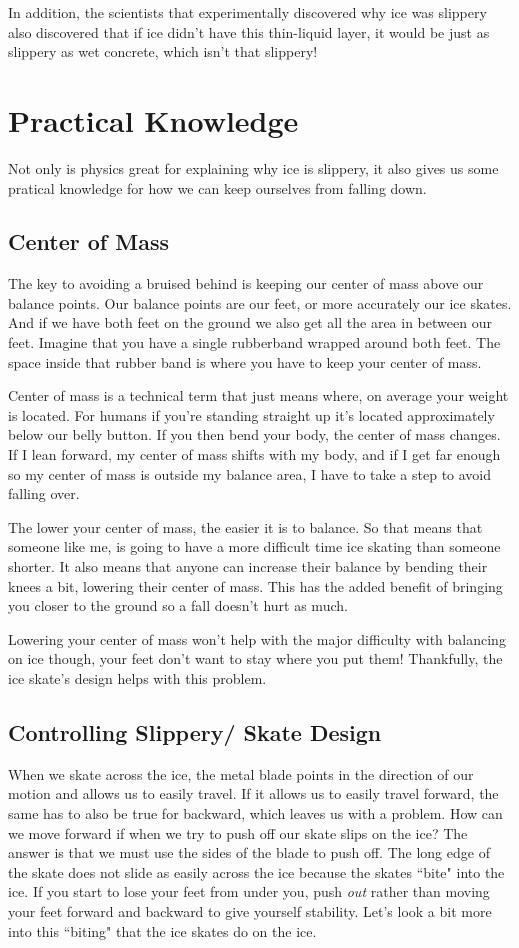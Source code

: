 \documentclass[12pt]{article}
\begin{document}
In addition, the scientists that experimentally discovered why ice was slippery 
also discovered that if ice didn't have this thin-liquid layer, it would be 
just as slippery as wet concrete, which 
isn't that slippery!

\section{Practical Knowledge}
Not only is physics great for explaining why ice is slippery, 
it also gives us some pratical knowledge for how we can keep
ourselves from falling down. 

\subsection{Center of Mass}
The key to avoiding a bruised behind is keeping 
our center of mass above our balance points. Our balance points
are our feet, or more accurately our ice skates. And if we have both
feet on the ground we also get all the area in between our feet.
Imagine that you have a single rubberband wrapped around both feet.
The space inside that rubber band is where you have to keep your
center of mass.

Center of mass is a technical term that just means where, on average
your weight is located.  For humans if you're standing
straight up it's located approximately  below our belly button. 
If you then bend your body, the center of mass changes. If I lean forward, 
my center of mass shifts with my body, and if I get far enough so my center 
of mass is outside my balance area, I have to take a step to avoid 
falling over. 

The lower your center
of mass, the easier it is to balance. So that means that someone
like me, is going to have a more difficult time ice skating than
someone shorter. It also means that anyone can increase their 
balance by bending their knees a bit, lowering their center of mass. 
This has the added benefit of bringing you closer to the ground so 
a fall doesn't hurt as much.

Lowering your center of mass won't help with the major difficulty 
with balancing on ice though, your feet don't want to stay 
where you put them! Thankfully, the ice skate's design helps 
with this problem. 


\subsection{Controlling Slippery/ Skate Design}
When we skate across the ice, the metal blade
points in the direction of our motion and allows us to easily travel. 
If it allows us to easily travel forward, the same has to also be true 
for backward, which leaves us with a problem. 
How can we move forward if when we try to push off our skate slips 
on the ice? The answer
is that we must use the sides of the blade to push off. The long
edge of the skate does not slide as easily across the ice because the
skates ``bite" into the ice. If you start to lose your feet from under you,
push \emph{out} rather than moving your feet forward and backward to 
give yourself stability. Let's look a bit more into this ``biting" that
the ice skates do on the ice. 
\end{document}
